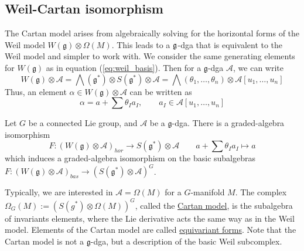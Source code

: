 \subsection{Weil-Cartan isomorphism}
The Cartan model arises from algebraically solving for the horizontal forms of the
Weil model $W(\mathfrak{g})\otimes \Omega(M)$. This leads to a $\operatorname{\mathfrak{g}}$-dga that is 
equivalent to the Weil model and simpler to work with.
We consider the same generating elements for $W(\mathfrak{g})$ as in equation 
(\ref{eq:weil_basis}). Then for a $\mathfrak{g}$-dga  $\mathcal{A}$, we can write 
\[
	W(\mathfrak{g})\otimes \mathcal{A} 
	= \bigwedge(\mathfrak{g}^*) \otimes S(\mathfrak{g}^*) \otimes \mathcal{A}
	= \bigwedge(\theta_1,\ldots,\theta_n) \otimes \mathcal{A}[u_1,\ldots,u_n]
\] 
Thus, an element $\alpha\in W(\mathfrak{g})\otimes \mathcal{A}$ can be written as 
\[
	\alpha = a + \sum \theta_{I}a_I, \qquad a_I \in \mathcal{A}[u_1,\ldots,u_n]
\] 
\begin{thm} \label{thm:weil_cartan_iso} %
	Let $G$ be a connected Lie group, and $\mathcal{A}$ be a $\mathfrak{g}$-dga. 
	There is a graded-algebra isomorphism 
	\[
		F : (W(\mathfrak{g})\otimes \mathcal{A})_{hor} 
		\to S(\mathfrak{g}^*)\otimes \mathcal{A} 
		\qquad a+ \sum \theta_I a_I \mapsto a
	\] 
	which induces a graded-algebra isomorphism on the basic subalgebras
	$F : (W(\mathfrak{g})\otimes \mathcal{A})_{bas} \to (S(\mathfrak{g}^*)\otimes
	\mathcal{A})^G$. 
\end{thm}
Typically, we are interested in $\mathcal{A}=\Omega(M)$ for a $G$-manifold  $M$.
The complex $\Omega_G(M):=(S(g^*)\otimes \Omega(M))^G$, called the 
\underline{Cartan model}, is the subalgebra of invariants elements, where the
Lie derivative acts the same way as in the Weil model. 
Elements of the Cartan model are called 
\underline{equivariant forms}.  
Note that the Cartan model is not a $\mathfrak{g}$-dga, but a description 
of the basic Weil subcomplex.

